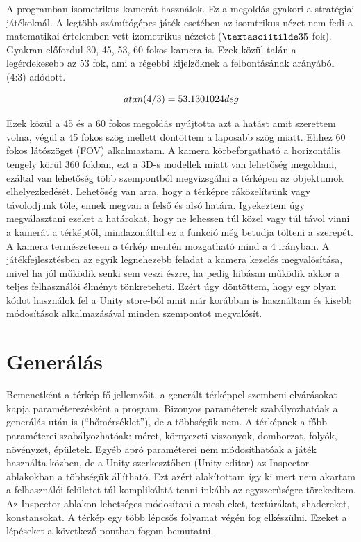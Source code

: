 A programban isometrikus kamerát használok. Ez a megoldás gyakori a stratégiai játékoknál. A legtöbb számítógépes játék esetében az isomtrikus nézet nem fedi a matematikai értelemben vett izometrikus nézetet ($\textasciitilde 35$ fok). Gyakran előfordul 30, 45, 53, 60 fokos kamera is. Ezek közül talán a legérdekesebb az 53 fok, ami a régebbi kijelzőknek a felbontásának arányából (4:3) adódott. 

$$
atan(4 / 3) = 53.1301024 \space deg
$$

Ezek közül a 45 és a 60 fokos megoldás nyújtotta azt a hatást amit szerettem volna, végül a 45 fokos szög mellett döntöttem a laposabb szög miatt. Ehhez 60 fokos látószöget (FOV) alkalmaztam. A kamera körbeforgatható a horizontális tengely körül 360 fokban, ezt a 3D-s modellek miatt van lehetőség megoldani, ezáltal van lehetőség több szempontból megvizsgálni a térképen az objektumok elhelyezkedését. Lehetőség van arra, hogy a térképre ráközelítsünk vagy távolodjunk tőle, ennek megvan a felső és alsó határa. Igyekeztem úgy megválasztani ezeket a határokat, hogy ne lehessen túl közel vagy túl távol vinni a kamerát a térképtől, mindazonáltal ez a funkció még betudja tölteni a szerepét. A kamera természetesen a térkép mentén mozgatható mind a 4 irányban. 
\newline
\newline A játékfejlesztésben az egyik legnehezebb feladat a kamera kezelés megvalósítása, mivel ha jól működik senki sem veszi észre, ha pedig hibásan működik akkor a teljes felhasználói élményt tönkreteheti. Ezért úgy döntöttem, hogy egy olyan kódot használok fel a Unity store-ból amit már korábban is használtam és kisebb módosítások alkalmazásával minden szempontot megvalósít.

\section{Generálás}

Bemenetként a térkép fő jellemzőit, a generált térképpel szembeni elvárásokat kapja paraméterezésként a program. Bizonyos paraméterek szabályozhatóak a generálás után is (“hőmérséklet”), de a többségük nem. A térképnek a főbb paraméterei szabályozhatóak: méret, környezeti viszonyok, domborzat, folyók, növényzet, épületek. Egyéb apró paraméterei nem módosíthatóak a játék használta közben, de a Unity szerkesztőben (Unity editor) az Inspector ablakokban a többségük állítható. Ezt azért alakítottam így ki mert nem akartam a felhasználói felületet túl komplikálttá tenni inkább az egyszerűségre törekedtem. Az Inspector ablakon lehetséges módosítani a mesh-eket, textúrákat, shadereket, konstansokat.
\newline
\newline A térkép egy több lépcsős folyamat végén fog elkészülni. Ezeket a lépéseket a következő pontban fogom bemutatni.


